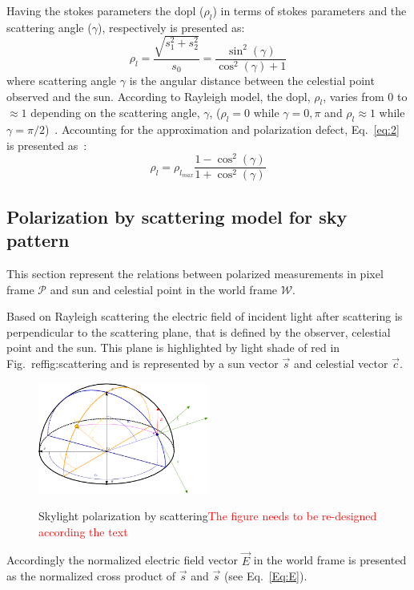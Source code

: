 Having the stokes parameters the \gls{dopl} ($\rho_{l}$) in terms of stokes
parameters and the scattering angle ($\gamma$), respectively is presented as:
\begin{equation}
  \label{eq:2}
  \rho_{l} = \frac{\sqrt{s_{1}^{2}+s_{2}^{2}}}{s_0} =
  \frac{\sin^{2}(\gamma)}{\cos^{
      2}(\gamma)+1}
\end{equation}
\noindent where scattering angle $\gamma$ is the angular distance between the
celestial point observed and the sun.
According to Rayleigh model, the \gls{dopl}, $\rho_{l}$, varies
from 0 to $\approx 1$ depending on the scattering angle, $\gamma$, ($\rho_{l} =
0$ while $\gamma = 0, \pi$ and $\rho_{l} \approx 1$ while $\gamma =
\pi/2$)~\cite{smith2007polarization, miyazaki09sunlightpolarization}.
Accounting for the approximation and polarization defect, Eq.~\ref{eq:2}
is presented as~\cite{pomozi2001clearsky}:
\begin{equation}
  \label{eq:3}
  \rho_{l} = \rho_{l_{max}}\frac{1 - \cos^{2}(\gamma)}{1 + \cos^{
      2}(\gamma)}
\end{equation}


\subsection{Polarization by scattering model for sky pattern}
This section represent the relations between polarized measurements in pixel
frame $\mathcal{P}$ and sun and celestial point in the world frame
$\mathcal{W}$.

Based on Rayleigh scattering the electric field of incident light after
scattering is perpendicular to the scattering plane, that is defined by the
observer, celestial point and the sun.
This plane is highlighted by light shade of red in Fig.~ref{fig:scattering} and
is represented by a sun vector $\vec{s}$ and celestial vector $\vec{c}$.

\begin{figure}
  \centering
  \includegraphics[width=0.5\textwidth]{./content/intro/figures/polasky4-crop.pdf}
  \label{fig:scattering}
  \caption{Skylight polarization by scattering\textcolor{red}{The figure needs
      to be re-designed according the text}}
\end{figure}
Accordingly the normalized electric field vector $\vec{E}$ in the world frame
is presented as the normalized cross product of $\vec{s}$ and
$\vec{s}$ (see Eq.~\ref{Eq:E}).

